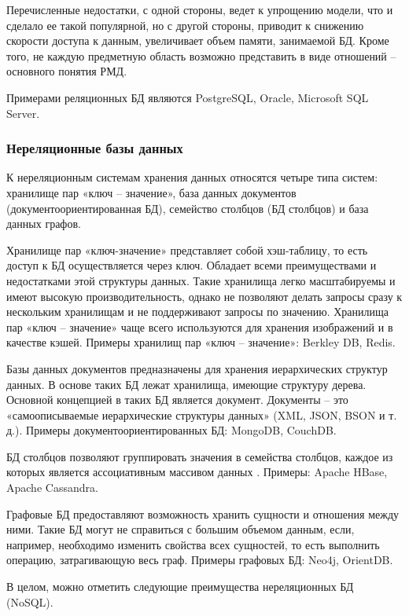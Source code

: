 \documentclass[a4paper,14pt]{article}
\begin{document}
Перечисленные недостатки, с одной стороны, ведет к упрощению модели, что и сделало ее такой популярной, но с другой стороны, приводит к снижению скорости доступа к данным, увеличивает объем памяти, занимаемой БД. Кроме того, не каждую предметную область возможно представить в виде отношений – основного понятия РМД.

Примерами реляционных БД являются PostgreSQL, Oracle, Microsoft SQL Server.

\subsubsection{Нереляционные базы данных}

К нереляционным системам хранения данных относятся четыре типа систем: хранилище пар «ключ – значение», база данных документов (документоориентированная БД), семейство столбцов (БД столбцов) и база данных графов.

Хранилище пар «ключ-значение» представляет собой хэш-таблицу, то есть доступ к БД осуществляется через ключ. Обладает всеми преимуществами и недостатками этой структуры данных. Такие хранилища легко масштабируемы и имеют высокую производительность, однако не позволяют делать запросы сразу к нескольким хранилищам и не поддерживают запросы по значению. Хранилища пар «ключ – значение» чаще всего используются для хранения изображений и в качестве кэшей. Примеры хранилищ пар «ключ – значение»: Berkley DB, Redis.

Базы данных документов предназначены для хранения иерархических структур данных. В основе таких БД лежат хранилища, имеющие структуру дерева. Основной концепцией в таких БД является документ. Документы – это «самоописываемые иерархические структуры данных» \cite{nosql} (XML, JSON, BSON и т. д.). Примеры документоориентированных БД: MongoDB, CouchDB.

БД столбцов позволяют группировать значения в семейства столбцов, каждое из которых является ассоциативным массивом данных \cite{nosql}. Примеры: Apache HBase, Apache Cassandra.

Графовые БД предоставляют возможность хранить сущности и отношения между ними. Такие БД могут не справиться с большим объемом данным, если, например, необходимо изменить свойства всех сущностей, то есть выполнить операцию, затрагивающую весь граф. Примеры графовых БД: Neo4j, OrientDB.

В целом, можно отметить следующие преимущества нереляционных БД (NoSQL).
\end{document}
